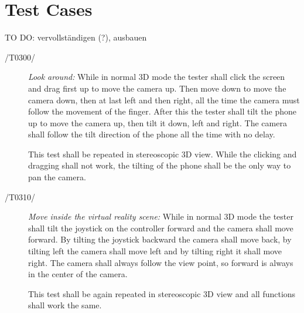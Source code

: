 \section{Test Cases}

TO DO: vervollständigen (?), ausbauen





\begin{description}
  \item[/T0300/]
    \textit{Look around:} While in normal 3D mode the tester shall click the screen and drag first up to move the camera up.
    Then move down to move the camera down, then at last left and then right, all the time the camera must follow the movement of the finger.
    After this the tester shall tilt the phone up to move the camera up, then tilt it down, left and right. The camera shall follow the tilt direction of the phone all the time with no delay.

    This test shall be repeated in stereoscopic 3D view. While the clicking and dragging shall not work, the tilting of the phone shall be the only way to pan the camera.
\end{description}

\begin{description}
  \item[/T0310/]
    \textit{Move inside the virtual reality scene:} While in normal 3D mode the tester shall tilt the joystick on the controller forward and the camera shall move forward.
    By tilting the joystick backward the camera shall move back, by tilting left the camera shall move left and by tilting right it shall move right.
    The camera shall always follow the view point, so forward is always in the center of the camera.

    This test shall be again repeated in stereoscopic 3D view and all functions shall work the same.
\end{description}

